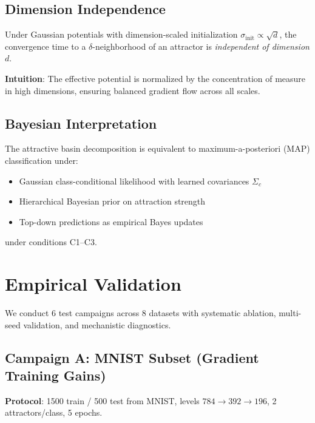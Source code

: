 \documentclass[11pt,a4paper]{article}
\begin{document}
\subsection{Dimension Independence}

\begin{theorem}
Under Gaussian potentials with dimension-scaled initialization $\sigma_{\text{init}} \propto \sqrt{d}$, the convergence time to a $\delta$-neighborhood of an attractor is \emph{independent of dimension} $d$.
\end{theorem}

\textbf{Intuition}: The effective potential is normalized by the concentration of measure in high dimensions, ensuring balanced gradient flow across all scales.

\subsection{Bayesian Interpretation}

\begin{theorem}
The attractive basin decomposition is equivalent to maximum-a-posteriori (MAP) classification under:
\begin{itemize}
  \item Gaussian class-conditional likelihood with learned covariances $\Sigma_c$
  \item Hierarchical Bayesian prior on attraction strength
  \item Top-down predictions as empirical Bayes updates
\end{itemize}
under conditions C1–C3.
\end{theorem}

\section{Empirical Validation}

We conduct 6 test campaigns across 8 datasets with systematic ablation, multi-seed validation, and mechanistic diagnostics.

\subsection{Campaign A: MNIST Subset (Gradient Training Gains)}

\textbf{Protocol}: 1500 train / 500 test from MNIST, levels $784 \to 392 \to 196$, 2 attractors/class, 5 epochs.
\end{document}
